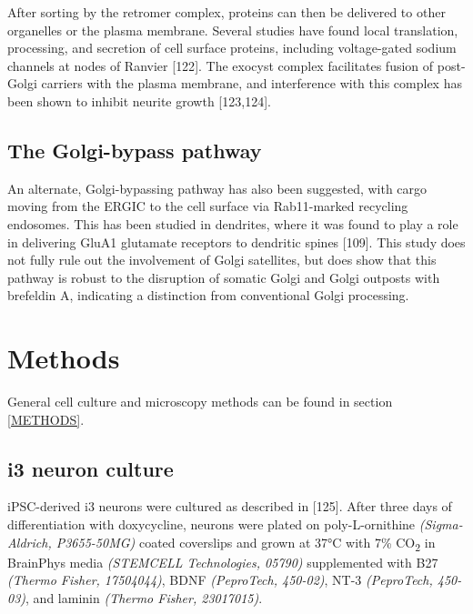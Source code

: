 \documentclass[
  12pt,
  a4paper,
]{book}
\begin{document}
After sorting by the retromer complex, proteins can then be delivered to other organelles or the plasma membrane. Several studies have found local translation, processing, and secretion of cell surface proteins, including voltage-gated sodium channels at nodes of Ranvier {[}122{]}. The exocyst complex facilitates fusion of post-Golgi carriers with the plasma membrane, and interference with this complex has been shown to inhibit neurite growth {[}123,124{]}.

\hypertarget{the-golgi-bypass-pathway}{%
\subsection{The Golgi-bypass pathway}\label{the-golgi-bypass-pathway}}

An alternate, Golgi-bypassing pathway has also been suggested, with cargo moving from the ERGIC to the cell surface via Rab11-marked recycling endosomes. This has been studied in dendrites, where it was found to play a role in delivering GluA1 glutamate receptors to dendritic spines {[}109{]}. This study does not fully rule out the involvement of Golgi satellites, but does show that this pathway is robust to the disruption of somatic Golgi and Golgi outposts with brefeldin A, indicating a distinction from conventional Golgi processing.

\hypertarget{methods-2}{%
\section{Methods}\label{methods-2}}

General cell culture and microscopy methods can be found in section \ref{METHODS}.

\hypertarget{i3-neuron-culture}{%
\subsection{i3 neuron culture}\label{i3-neuron-culture}}

iPSC-derived i3 neurons were cultured as described in {[}125{]}. After three days of differentiation with doxycycline, neurons were plated on poly-L-ornithine \emph{(Sigma-Aldrich, P3655-50MG)} coated coverslips and grown at 37°C with 7\% CO\textsubscript{2} in BrainPhys media \emph{(STEMCELL Technologies, 05790)} supplemented with B27 \emph{(Thermo Fisher, 17504044)}, BDNF \emph{(PeproTech, 450-02)}, NT-3 \emph{(PeproTech, 450-03)}, and laminin \emph{(Thermo Fisher, 23017015)}.
\end{document}
